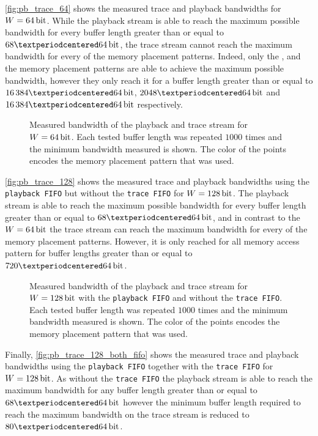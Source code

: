 \autoref{fig:pb_trace_64} shows the measured trace and playback bandwidths for $W = \SI{64}{\bit}$. While the playback stream is able to reach the maximum possible bandwidth for every buffer length greater than or equal to $\num{68} · \PhyWordSize$, the trace stream cannot reach the maximum bandwidth for every of the memory placement patterns. Indeed, only the \linear{}, \random{} and the \randomDense{} memory placement patterns are able to achieve the maximum possible bandwidth, however they only reach it for a buffer length greater than or equal to $\num{16384} · \PhyWordSize$, $\num{2048} · \PhyWordSize$ and $\num{16384} · \PhyWordSize$ respectively.

\begin{figure}[H]
\caption{Measured bandwidth of the playback and trace stream for $W = \SI{64}{\bit}$. Each tested buffer length was repeated $\num{1000}$ times and the minimum bandwidth measured is shown. The color of the points encodes the memory placement pattern that was used.}\label{fig:pb_trace_64}
\end{figure}

\autoref{fig:pb_trace_128} shows the measured trace and playback bandwidths using the \texttt{playback FIFO} but without the \texttt{trace FIFO} for $W = \SI{128}{\bit}$. The playback stream is able to reach the maximum possible bandwidth for every buffer length greater than or equal to $\num{68} · \PhyWordSize$, and in contrast to the $W = \SI{64}{\bit}$ the trace stream can reach the maximum bandwidth for every of the memory placement patterns. However, it is only reached for all memory access pattern for buffer lengths greater than or equal to $\num{720} · \PhyWordSize$.
\begin{figure}[H]
\caption{Measured bandwidth of the playback and trace stream for $W = \SI{128}{\bit}$ with the \texttt{playback FIFO} and without the \texttt{trace FIFO}. Each tested buffer length was repeated $\num{1000}$ times and the minimum bandwidth measured is shown. The color of the points encodes the memory placement pattern that was used.}\label{fig:pb_trace_128}
\end{figure}

Finally, \autoref{fig:pb_trace_128_both_fifo} shows the measured trace and playback bandwidths using the \texttt{playback FIFO} together with the \texttt{trace FIFO} for $W = \SI{128}{\bit}$. As without the \texttt{trace FIFO} the playback stream is able to reach the maximum bandwidth for any buffer length greater than or equal to $\num{68} · \PhyWordSize$ however the minimum buffer length required to reach the maximum bandwidth on the trace stream is reduced to $80 · \PhyWordSize$.

